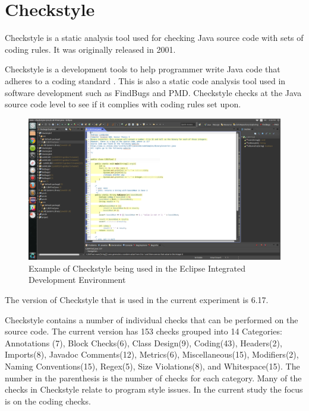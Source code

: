 \chapter{Checkstyle}\label{ch:Checkstyle}

Checkstyle is a static analysis tool used for checking Java source code with sets of coding rules. It was originally released in 2001.

Checkstyle is a development tools to help programmer write Java code that adheres to a coding standard \cite{Merson:2013:UAE:2508075.2508433}. This is also a static code analysis tool used in software development such as FindBugs and PMD. Checkstyle checks at the Java source code level to see if it complies with coding rules set upon. 

\begin{figure}[h]
\begin{center}
\includegraphics[width=1.15\textwidth]{Checkstyle.png}
\end{center}
\caption{Example of Checkstyle being used in the Eclipse Integrated Development Environment}
\end{figure}
The version of Checkstyle that is used in the current experiment is 6.17.

Checkstyle contains a number of individual checks that can be performed on the source code. The current version has 153 checks grouped into 14 Categories: Annotations (7), Block Checks(6), Class Design(9), Coding(43), Headers(2), Imports(8), Javadoc Comments(12), Metrics(6), Miscellaneous(15), Modifiers(2), Naming Conventions(15), Regex(5), Size Violations(8), and Whitespace(15). The number in the parenthesis is the number of checks for each category. Many of the checks in Checkstyle relate to program style issues. In the current study the focus is on the coding checks.

